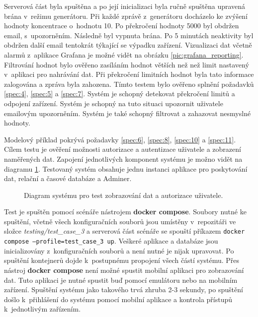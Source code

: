 Serverová část byla spuštěna a po její inicializaci byla ručně spuštěna upravená brána v~režimu generátoru. Při každé zprávě z~generátoru docházelo ke zvýšení hodnoty koncentrace o~hodnotu 10. Po překročení hodnoty 5000 byl obdržen email, s~upozorněním. Následně byl vypnuta brána. Po 5 minutách neaktivity byl obdržen další email tentokrát týkající se výpadku zařízení. Vizualizaci dat včetně alarmů z~aplikace Grafana je možné vidět na obrázku \ref{pic:grafana_reporting}. Filtrování hodnot bylo ověřeno zasíláním hodnot větších než než limit nastavený v~aplikaci pro nahrávání dat. Při překročení limitních hodnot byla tato informace zalogována a zpráva byla zahozena. Tímto testem bylo ověřeno splnění požadavků \ref{spec:4}, \ref{spec:5} a \ref{spec:7}. Systém je schopný detekovat překročení limitů a odpojení zařízení. Systém je schopný na tuto situaci upozornit uživatele emailovým upozorněním. Systém je také schopný filtrovat a zahazovat nesmyslné hodnoty.




Modelový příklad pokrývá požadavky \ref{spec:6}, \ref{spec:8}, \ref{spec:10} a \ref{spec:11}. Cílem testu je ověření možnosti autorizace a autentizace uživatele a zobrazení naměřených dat. Zapojení jednotlivých komponent systému je možno vidět na diagramu \ref{pic:test_3_setup}. Testovaný systém obsahuje jednu instanci aplikace pro poskytování dat, relační a časové databáze a Adminer.

\begin{figure}[h]
  \centering
  
  \caption{Diagram systému pro test zobrazování dat a autorizace uživatele.}
  \label{pic:test_3_setup}
\end{figure}

Test je spuštěn pomocí scénáře nástrojem \textbf{docker compose}. Soubory nutné ke spuštění, včetně všech konfiguračních souborů jsou umístěny v~repozitáři ve složce \textit{testing/test\_case\_3} a serverová část scénáře se spouští příkazem \texttt{docker compose --profile=test\_case\_3 up}. Veškeré aplikace a databáze jsou inicializovány z~konfiguračních souborů a není nutné je nijak upravovat. Po spuštění kontejnerů dojde k~postupnému propojení všech částí systému. Přes nástroj \textbf{docker compose} není možné spustit mobilní aplikaci pro zobrazování dat. Tuto aplikaci je nutné spustit buď pomocí emulátoru nebo na mobilním zařízení. Spuštění systému jako takového trvá zhruba 2-3 sekundy, po spuštění došlo k~přihlášení do systému pomocí mobilní aplikace a kontrola přístupů k~jednotlivým zařízením.


